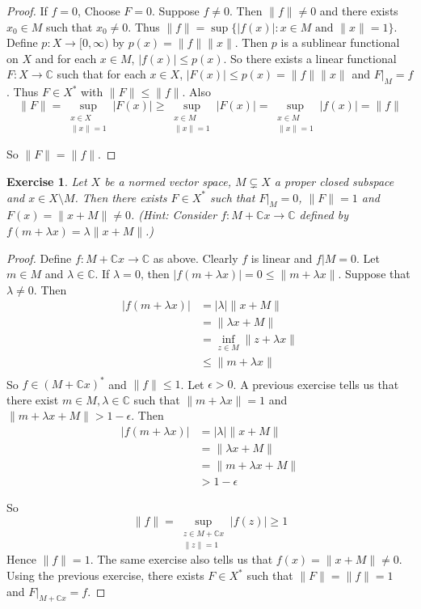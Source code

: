 \documentclass[12pt]{amsart}
\newtheorem{ex}[thm]{Exercise}
\newcommand{\lam}{\lambda}
\newcommand{\ep}{\epsilon}
\newcommand{\C}{\mathbb{C}}
\newcommand{\Rg}{[0,\infty)}
\begin{document}
	\begin{proof}
		If $f =0$, Choose $F=0$. Suppose $f \neq 0$. Then $\|f \|\neq 0$ and there exists $x_0 \in M$ such that $x_0  \neq 0$. Thus $\|f \|= \sup \{ \vert f(x) \vert: x \in M \text{ and } \|x \|= 1\}$. Define $p:X \rightarrow \Rg$ by $ p(x) = \|f \|\|x \|$. Then $p$ is a sublinear functional on $X$ and for each $x \in M$, $\vert f(x) \vert \leq p(x)$. So there exists a linear functional $F:X \rightarrow \C$ such that for each $x \in X$, $\vert F(x) \vert \leq p(x) = \|f \|\|x \|$ and $F|_M = f$. Thus $F \in X^*$ with $\|F \|\leq \|f \|$. Also $$\|F \|= \sup_{\substack{ x \in X \\ \|x \|= 1}} \vert F(x) \vert \geq  \sup_{\substack{ x \in M \\ \|x \|= 1}} \vert F(x) \vert = \sup_{\substack{ x \in M \\ \|x \|= 1}} \vert f(x) \vert = \|f \|$$
		
		So $\|F \|= \|f \|$.
	\end{proof}
	
	\begin{ex}
		Let $X$ be a normed vector space, $M \subsetneq X$ a proper closed subspace and $x \in X \setminus M$. Then there exists $F \in X^*$ such that $F|_M = 0$, $\|F \|=1$ and $ F(x) = \|x+M \|\neq 0$. (Hint: Consider $f:M+\C x \rightarrow \C$ defined by $f(m+\lam x) = \lam \|x +M \|$.)
	\end{ex}
	
	\begin{proof}
		Define $f:M+\C x \rightarrow \C$ as above. Clearly $f$ is linear and $f|M = 0$. Let $m \in M$ and $\lam \in \C$. If $\lam = 0$, then $\vert f(m +\lam x) \vert = 0 \leq \|m+ \lam x \|$. Suppose that $\lam \neq 0$. Then 
		\begin{align*}
			\vert f(m+\lam x) \vert 
			& = \vert \lam \vert \|x+M \|\\
			& =  \|\lam x+M \|\\
			& = \inf_{z \in M} \|z+ \lam x \|\\
			& \leq  \|m+ \lam x  \|\\
		\end{align*} 
		So $f \in (M+\C x )^*$ and $\|f \|\leq 1$. Let $\ep >0$. A previous exercise tells us that there exist $m \in M, \lam \in \C$ such that $\|m+ \lam x \|= 1$ and $\|m+ \lam x +M \|> 1- \ep$. Then 
		\begin{align*}
			\vert f(m + \lam x) \vert
			&= \vert \lam \vert \|x+M\|\\
			&=\|\lam x +M \|\\
			&= \|m + \lam x +M \|\\
			&> 1-\ep
		\end{align*}
		
		So $$ \|f \|= \sup_{\substack{z \in M + \C x \\ \|z \|=1}} \vert f(z) \vert \geq 1$$ Hence $\|f \|=1$. 
		The same exercise also tells us that $f(x) = \|x+M\|\neq 0$. Using the previous exercise, there exists $F \in X^*$ such that $\|F \|= \|f \|= 1$ and $F|_{M+\C x} = f$.
	\end{proof}
	
\end{document}
